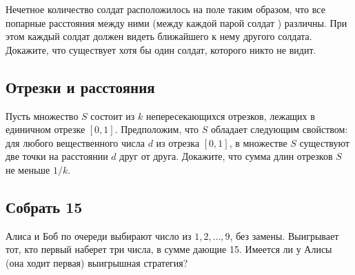 Нечетное количество солдат расположилось на поле таким образом, что все попарные расстояния между ними (между каждой парой солдат ) различны. 
При этом каждый солдат должен видеть  ближайшего к нему другого солдата.
Докажите, что существует хотя бы один солдат, которого никто не видит.




\subsection*{Отрезки и расстояния}    %


Пусть множество $S$ состоит из $k$ непересекающихся отрезков, лежащих в единичном отрезке $[0,1]$. 
Предположим, что $S$ обладает следующим свойством: для любого вещественного числа $d$ из отрезка $[0,1]$,  в множестве $S$ существуют две точки на расстоянии $d$ друг от друга. 
Докажите, что сумма длин отрезков $S$ не меньше $1/k$.

   
\subsection*{Собрать 15} %

Алиса и Боб по очереди выбирают число из $1, 2,\dots ,9$, без замены. 
Выигрывает тот, кто первый наберет три числа, в сумме дающие 15. 
Имеется ли у Алисы (она ходит первая)
выигрышная стратегия?
